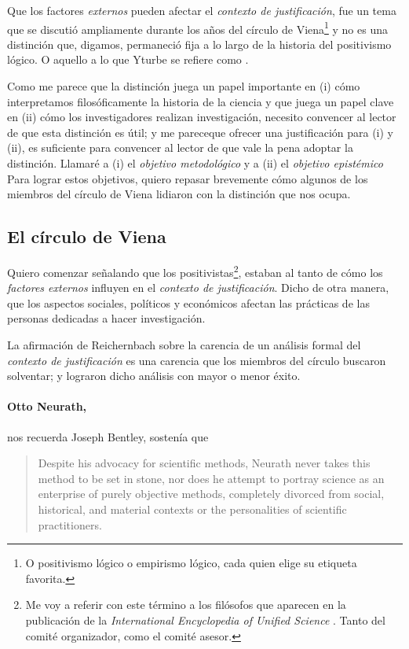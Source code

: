 Que los factores \emph{externos} pueden afectar el \emph{contexto de justificación}, fue un tema que se discutió ampliamente durante los años del círculo de Viena\footnote{
	O positivismo lógico o empirismo lógico, cada quien elige su etiqueta favorita.
} y no es una distinción que, digamos, permaneció fija a lo largo de la historia del positivismo lógico. 
O aquello a lo que Yturbe se refiere como .

Como me parece que la distinción juega un papel importante en (i) cómo interpretamos filosóficamente la historia de la ciencia y que juega un papel clave en (ii) cómo los investigadores realizan investigación, necesito convencer al lector de que esta distinción es útil; 
y me pareceque ofrecer una justificación para (i) y (ii), es suficiente para convencer al lector de que vale la pena adoptar la distinción.
Llamaré a (i) el \emph{objetivo metodológico} y a (ii) el \emph{objetivo epistémico}
Para lograr estos objetivos, quiero repasar brevemente cómo algunos de los miembros del círculo de Viena lidiaron con la distinción que nos ocupa.


\subsection{El círculo de Viena}

\noindent Quiero comenzar señalando que los positivistas\footnote{
	Me voy a referir con este término a los filósofos que aparecen en la publicación de la \emph{International Encyclopedia of Unified Science} \parencite{Carnap1938-CARFOL-10}.
	Tanto del comité organizador, como el comité asesor.
	}, 
estaban al tanto de cómo los \emph{factores externos} influyen en el \emph{contexto de justificación}.
Dicho de otra manera, que los aspectos sociales, políticos y económicos afectan las prácticas de las personas dedicadas a hacer investigación.

La afirmación de Reichernbach sobre la carencia de un análisis formal del \emph{contexto de justificación} es una carencia que los miembros del círculo buscaron solventar; y lograron dicho análisis con mayor o menor éxito.

\paragraph{Otto Neurath,} nos recuerda Joseph Bentley, sostenía que

\begin{quote}
	Despite his advocacy for scientific methods, Neurath never takes this method to be set in stone, nor does he attempt to portray science as an enterprise of purely objective methods, completely divorced from social, historical, and material contexts or the personalities of scientific practitioners. \parencite[p.~41]{Bentley2023}
\end{quote}

